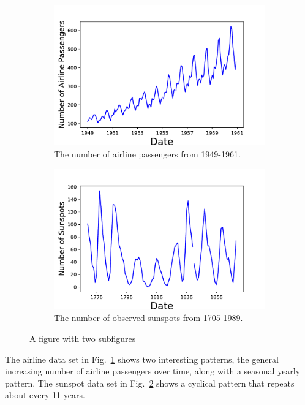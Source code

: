 \documentclass[10pt,a4paper]{article}
\begin{document}
\begin{figure}[h]
\centering
\begin{subfigure}{.5\textwidth}
  \centering
  \includegraphics[scale=0.41]{Airline_Passengers.pdf}
  \caption{The number of airline passengers from 1949-1961.}
  \label{fig:Airline example}
\end{subfigure}%
\begin{subfigure}{.5\textwidth}
  \centering
  \includegraphics[scale=0.41]{Sunspot.pdf}
 \caption{The number of observed sunspots from 1705-1989. }
  \label{fig:Sunspot example}
\end{subfigure}
\caption{A figure with two subfigures}
\label{fig:test}
\end{figure}


The airline data set in Fig.~\ref{fig:Airline example} shows two interesting patterns, the general increasing number of airline passengers over time, along with a seasonal yearly pattern. The sunspot data set in Fig.~\ref{fig:Sunspot example} shows a cyclical pattern that repeats about every 11-years.
\end{document}
